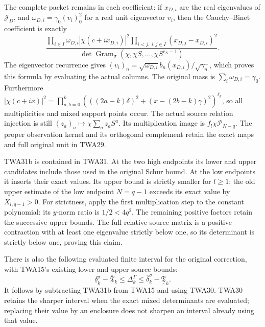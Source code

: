 The complete packet remains in each coefficient: if $x_{D,i}$
are the real eigenvalues of $\mathcal J_D$, and
$\omega_{D,i}=\gamma_0(v_i)_0^2$ for a real unit eigenvector
$v_i$, then the Cauchy--Binet coefficient is exactly
\[
 \frac{\displaystyle\prod_{i\in I}
 \omega_{D,i}|\chi(c+ix_{D,i})|^2
 \prod_{i<j,\ i,j\in I}(x_{D,j}-x_{D,i})^2}
 {\displaystyle\det\operatorname{Gram}_\sigma
                   (\chi,\chi S,\ldots,\chi S^{r_N-1})}.
\]
The eigenvector recurrence gives
$(v_i)_n=\sqrt{\omega_{D,i}}b_n(x_{D,i})/\sqrt{\gamma_n}$,
which proves this formula by evaluating the actual columns.
The original mass is $\sum_i\omega_{D,i}=\gamma_0$.
Furthermore
$|\chi(c+ix)|^2=\prod_{a,b=0}^k
(((2a-k)\delta)^2+(x-(2b-k)\gamma)^2)^{\ell_k}$,
so all multiplicities and mixed support points occur.
The actual source relation injection is still
$(z_a)_a\mapsto\chi\sum_a z_aS^a$.
Its multiplication image is $f_l\chi\mathcal P_{N-q}$.
The proper observation kernel and its orthogonal complement
retain the exact maps and full original unit in TWA29.

TWA31b is contained in TWA31. At the two high endpoints
its lower and upper candidates include those used in the
original Schur bound. At the low endpoints it inserts their
exact values. Its upper bound is strictly smaller for $l\geq1$:
the old upper estimate of the low endpoint $N=q-1$ exceeds
its exact value by $X_{l,q-1}>0$.
For strictness, apply the first multiplication step to the
constant polynomial: its $y$-norm ratio is $1/2<4q^2$.
The remaining positive factors retain the successive upper
bounds. The full relative source matrix is a positive
contraction with at least one eigenvalue strictly below one,
so its determinant is strictly below one, proving this claim.

There is also the following evaluated finite interval for the
original correction, with TWA15's existing lower and upper
source bounds:
\[
 \boxed{\quad
 \underline\delta_k^\sigma-\overline{\mathfrak T}_k
 \leq\Delta_k^\Gamma
 \leq\overline\delta_k^\sigma-\underline{\mathfrak T}_k.
 \quad}\tag{TWA31c}
\]
It follows by subtracting TWA31b from TWA15 and using TWA30.
TWA30 retains the sharper interval when the exact mixed
determinants are evaluated; replacing their value by an
enclosure does not sharpen an interval already using that value.

